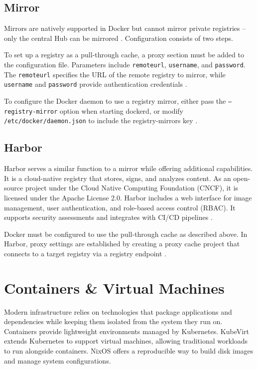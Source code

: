 \subsection{Mirror}
Mirrors are natively supported in Docker but cannot mirror private registries -- only the central Hub can be mirrored \Parencite{dockerhubmirror}. Configuration consists of two steps.

To set up a registry as a pull-through cache, a proxy section must be added to the configuration file. Parameters include \texttt{remoteurl}, \texttt{username}, and \texttt{password}. The \texttt{remoteurl} specifies the URL of the remote registry to mirror, while \texttt{username} and \texttt{password} provide authentication credentials \Parencite{dockerhubmirror}.

To configure the Docker daemon to use a registry mirror, either pass the \texttt{--registry-mirror} option when starting dockerd, or modify \texttt{/etc/docker/\allowbreak daemon.json} to include the registry-mirrors key \Parencite{dockerhubmirror}.

\subsection{Harbor}
Harbor serves a similar function to a mirror while offering additional capabilities. It is a cloud-native registry that stores, signs, and analyzes content. As an open-source project under the Cloud Native Computing Foundation (CNCF), it is licensed under the Apache License 2.0. Harbor includes a web interface for image management, user authentication, and role-based access control (RBAC). It supports security assessments and integrates with CI/CD pipelines \Parencite{harbor}.

Docker must be configured to use the pull-through cache as described above. In Harbor, proxy settings are established by creating a proxy cache project that connects to a target registry via a registry endpoint \Parencite{harbor}.

\section{Containers \& Virtual Machines} \label{sec:vm_vs_container}
Modern infrastructure relies on technologies that package applications and dependencies while keeping them isolated from the system they run on. Containers provide lightweight environments managed by Kubernetes. KubeVirt extends Kubernetes to support virtual machines, allowing traditional workloads to run alongside containers. NixOS offers a reproducible way to build disk images and manage system configurations.

